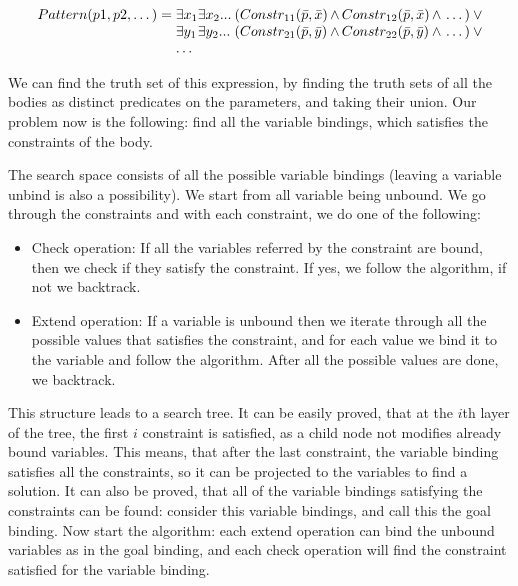 \begin{equation}
\begin{array}{@{}r@{}l@{}l@{}l@{}l@{}l@{}}
Pattern(p1, p2, \dots) = \;
& \exists{x_1} & \exists{x_2}... \: & 
(Constr_{11}(\bar{p},\bar{x} ) & \, \wedge \, Constr_{12}(\bar{p},\bar{x} ) & \, \wedge \, \dots{}) \: \vee \\

& \exists{y_1} & \exists{y_2}... \: & 
(Constr_{21}(\bar{p},\bar{y} ) & \, \wedge \, Constr_{22}(\bar{p},\bar{y} ) & \, \wedge \, \dots{}) \: \vee \\
& \dots{}
\end{array}
\end{equation}

We can find the truth set of this expression, by finding the truth sets of all the bodies as distinct predicates on the parameters, and taking their union.
Our problem now is the following: find all the variable bindings, which satisfies the constraints of the body.


The search space consists of all the possible variable bindings (leaving a variable unbind is also a possibility). 
We start from all variable being unbound. 
We go through the constraints and with each constraint, we do one of the following:
\begin{itemize}
	\item Check operation: If all the variables referred by the constraint are bound, then we check if they satisfy the constraint. If yes, we follow the algorithm, if not we backtrack.
	\item Extend operation: If a variable is unbound then we iterate through all the possible values that satisfies the constraint, and for each value we bind it to the variable and follow the algorithm. After all the possible values are done, we backtrack.
\end{itemize}

This structure leads to a search tree.
It can be easily proved, that at the $i$th layer of the tree, the first $i$ constraint is satisfied, as a child node not modifies already bound variables.
This means, that after the last constraint, the variable binding satisfies all the constraints, so it can be projected to the variables to find a solution.
It can also be proved, that all of the variable bindings satisfying the constraints can be found: 
consider this variable bindings, and call this the goal binding. Now start the algorithm: each extend operation can bind the unbound variables as in the goal binding, and each check operation will find the constraint satisfied for the variable binding.


